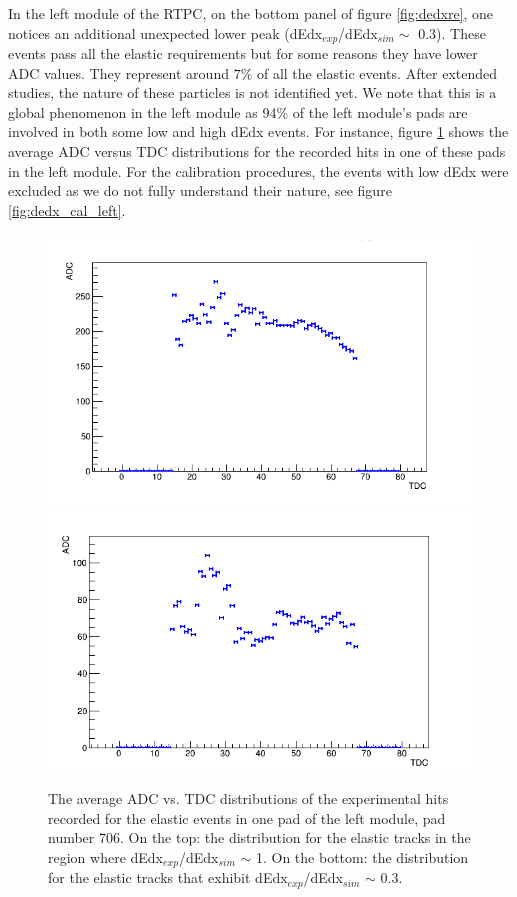 In the left module of the RTPC, on the bottom panel of figure \ref{fig:dedxre}, 
one notices an additional unexpected lower peak (dEdx$_{exp}$/dEdx$_{sim} \sim$ 
0.3). These events pass all the elastic requirements but for some reasons they 
have lower ADC values. They represent around $7\%$ of all the elastic events.  
After extended studies, the nature of these particles is not identified yet. We 
note that this is a global phenomenon in the left module as 94$\%$ of the left 
module's pads are involved in both some low and high dEdx events. For instance, 
figure \ref{fig:Chann_706} shows the average ADC versus TDC distributions for 
the recorded hits in one of these pads in the left module. For the calibration 
procedures, the events with low dEdx were excluded as we do not fully 
understand their nature, see figure \ref{fig:dedx_cal_left}.\\
\begin{figure}[tbp]
\centering
\includegraphics[scale=0.4]{fig_rtpc/Chan_706_1.png}
\includegraphics[scale=0.4]{fig_rtpc/Chan_706_2.png}
\caption{The average ADC vs. TDC distributions of the experimental hits 
   recorded for the elastic events in one pad of the left module, pad number 
   706.  On the top: the distribution for the elastic tracks in the region 
   where dEdx$_{exp}$/dEdx$_{sim} $ $\sim$ 1. On the bottom: the distribution 
for the elastic tracks that exhibit dEdx$_{exp}$/dEdx$_{sim} $ $\sim$ 0.3.}
\label{fig:Chann_706}
\end{figure}


